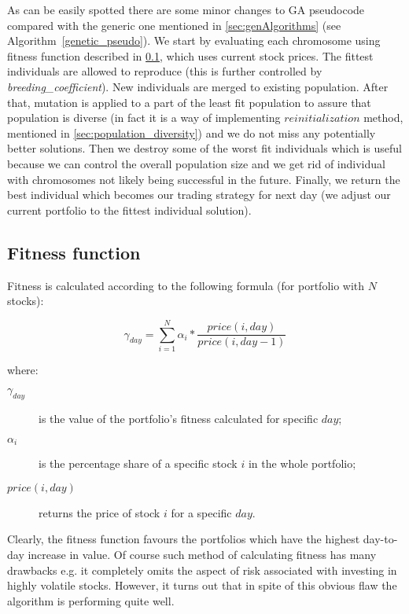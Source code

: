 As can be easily spotted there are some minor changes to GA pseudocode compared with the generic one mentioned in \ref{sec:genAlgorithms} 
(see Algorithm~\ref{genetic_pseudo}).
We start by evaluating each chromosome using fitness function described in \ref{sec:gen_fitness_fun}, which uses current stock prices.
The fittest individuals are allowed to reproduce (this is further controlled by \emph{breeding\_coefficient}).
New individuals are merged to existing population.
After that, mutation is applied to a part of the least fit population to assure that population is diverse (in fact it is a way of implementing $reinitialization$
method, mentioned in \ref{sec:population_diversity}) and we do not miss any potentially better solutions.
Then we destroy some of the worst fit individuals which is useful because we can control the overall population size and we get rid of individual with chromosomes
not likely being successful in the future.
Finally, we return the best individual which becomes our trading strategy for next day (we adjust our current portfolio to the fittest individual solution). 


\subsection{Fitness function}
\label{sec:gen_fitness_fun}

Fitness is calculated according to the following formula (for portfolio with $N$ stocks):

\begin{equation}
    \gamma_{day} =  \sum_{i=1}^{N} {  \alpha_{i} * \frac{price(i,day)}{price(i,day - 1)} }
\end{equation}

where:

\begin{description}
  \item [$\gamma_{day}$] 
      is the value of the portfolio's fitness calculated for specific $day$;
  \item [$\alpha_{i}$]
      is the percentage share of a specific stock $i$ in the whole portfolio;
  \item [$price(i,day)$]
      returns the price of stock $i$ for a specific $day$.
\end{description}

Clearly, the fitness function favours the portfolios which have the highest day-to-day increase in value.
Of course such method of calculating fitness has many drawbacks e.g. it completely omits the aspect of risk associated with investing in highly volatile stocks.
However, it turns out that in spite of this obvious flaw the algorithm is performing quite well.  

